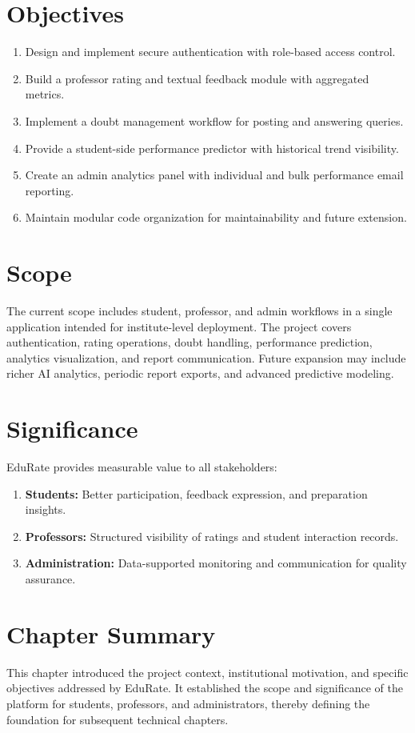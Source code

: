 \section{Objectives}
\begin{enumerate}[leftmargin=1.5em]
    \item Design and implement secure authentication with role-based access control.
    \item Build a professor rating and textual feedback module with aggregated metrics.
    \item Implement a doubt management workflow for posting and answering queries.
    \item Provide a student-side performance predictor with historical trend visibility.
    \item Create an admin analytics panel with individual and bulk performance email reporting.
    \item Maintain modular code organization for maintainability and future extension.
\end{enumerate}

\section{Scope}
The current scope includes student, professor, and admin workflows in a single application intended for institute-level deployment. The project covers authentication, rating operations, doubt handling, performance prediction, analytics visualization, and report communication. Future expansion may include richer AI analytics, periodic report exports, and advanced predictive modeling.

\section{Significance}
EduRate provides measurable value to all stakeholders:
\begin{enumerate}[label=\Alph*., leftmargin=1.5em]
    \item \textbf{Students:} Better participation, feedback expression, and preparation insights.
    \item \textbf{Professors:} Structured visibility of ratings and student interaction records.
    \item \textbf{Administration:} Data-supported monitoring and communication for quality assurance.
\end{enumerate}

\section*{Chapter Summary}
This chapter introduced the project context, institutional motivation, and specific objectives addressed by EduRate. It established the scope and significance of the platform for students, professors, and administrators, thereby defining the foundation for subsequent technical chapters.
